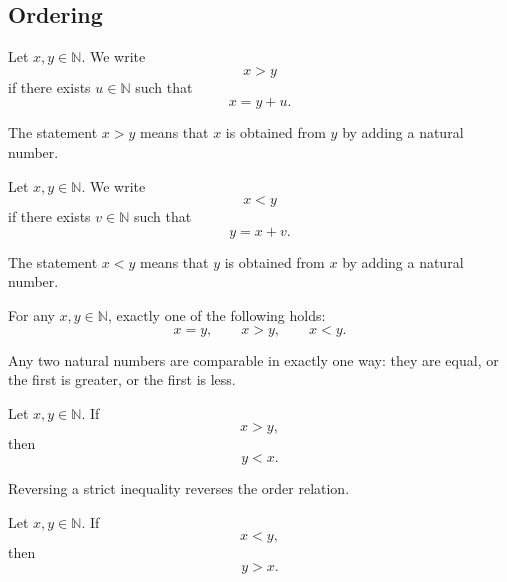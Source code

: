 \subsection{Ordering}

\begin{definition}
\label{def:greater-than}
Let \(x,y \in \mathbb{N}\). We write
\[
x > y
\]
if there exists \(u \in \mathbb{N}\) such that
\[
x = y + u.
\]
\end{definition}

\begin{remark*}[Interpretation]
The statement \(x > y\) means that \(x\) is obtained from \(y\) by adding a natural number.
\end{remark*}

\begin{definition}
\label{def:less-than}
Let \(x,y \in \mathbb{N}\). We write
\[
x < y
\]
if there exists \(v \in \mathbb{N}\) such that
\[
y = x + v.
\]
\end{definition}

\begin{remark*}[Interpretation]
The statement \(x < y\) means that \(y\) is obtained from \(x\) by adding a natural number.
\end{remark*}

\begin{theorem}
\label{thm:trichotomy-of-order}
For any \(x,y \in \mathbb{N}\), exactly one of the following holds:
\[
x = y,
\qquad
x > y,
\qquad
x < y.
\]
\end{theorem}

\begin{remark*}[Interpretation]
Any two natural numbers are comparable in exactly one way: they are equal, or the first is greater, or the first is less.
\end{remark*}

\begin{theorem}
\label{thm:symmetry-of-greater-than}
Let \(x,y \in \mathbb{N}\). If
\[
x > y,
\]
then
\[
y < x.
\]
\end{theorem}

\begin{remark*}[Interpretation]
Reversing a strict inequality reverses the order relation.
\end{remark*}

\begin{theorem}
\label{thm:symmetry-of-less-than}
Let \(x,y \in \mathbb{N}\). If
\[
x < y,
\]
then
\[
y > x.
\]
\end{theorem}

